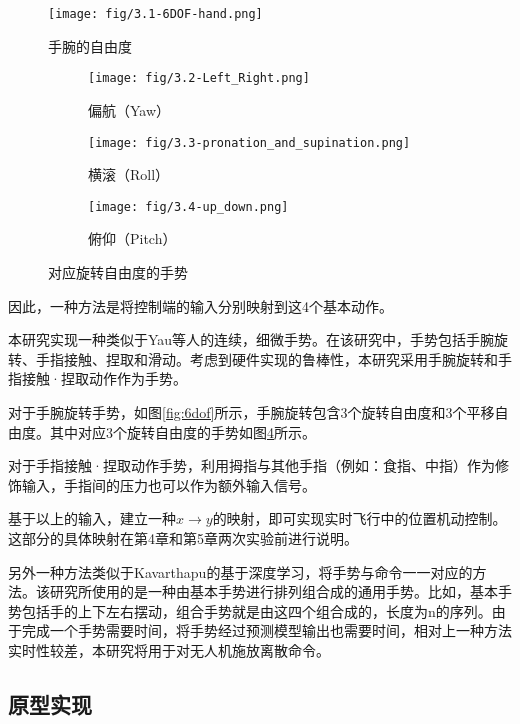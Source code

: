 \begin{figure}[t]
    \vspace{-20pt}
    \centering
    \texttt{[image: fig/3.1-6DOF-hand.png]}
    \caption{手腕的自由度}
    \label{fig:6dof}

    \centering
    \begin{subfigure}[b]{0.3\textwidth}
        \texttt{[image: fig/3.2-Left\_Right.png]}
        \caption{偏航（Yaw）}
        \label{fig:yaw}
    \end{subfigure}
    \hfill
    \begin{subfigure}[b]{0.3\textwidth}
        \texttt{[image: fig/3.3-pronation\_and\_supination.png]}
        \caption{横滚（Roll）}
        \label{fig:roll}
    \end{subfigure}
    \hfill
    \begin{subfigure}[b]{0.3\textwidth}
        \texttt{[image: fig/3.4-up\_down.png]}
        \caption{俯仰（Pitch）}
        \label{fig:pitch}
    \end{subfigure}
    \caption{对应旋转自由度的手势}
    \label{fig:three-guesture}
\end{figure}

\clearpage
因此，一种方法是将控制端的输入分别映射到这4个基本动作。

本研究实现一种类似于Yau等人\cite{yau2020subtle}的连续，细微手势。在该研究中，手势包括手腕旋转、手指接触、捏取和滑动。考虑到硬件实现的鲁棒性，本研究采用手腕旋转和手指接触·捏取动作作为手势。

对于手腕旋转手势，如图\ref{fig:6dof}所示，手腕旋转包含3个旋转自由度和3个平移自由度。其中对应3个旋转自由度的手势如图\ref{fig:three-guesture}所示。

对于手指接触·捏取动作手势，利用拇指与其他手指（例如：食指、中指）作为修饰输入，手指间的压力也可以作为额外输入信号。

基于以上的输入，建立一种$x\xrightarrow{}y$的映射，即可实现实时飞行中的位置机动控制。这部分的具体映射在第4章和第5章两次实验前进行说明。


另外一种方法类似于Kavarthapu\cite{kavarthapu2017hand}的基于深度学习，将手势与命令一一对应的方法。该研究所使用的是一种由基本手势进行排列组合成的通用手势。比如，基本手势包括手的上下左右摆动，组合手势就是由这四个组合成的，长度为n的序列。由于完成一个手势需要时间，将手势经过预测模型输出也需要时间，相对上一种方法实时性较差，本研究将用于对无人机施放离散命令。

\subsection{原型实现}\label{ssec:num1}

